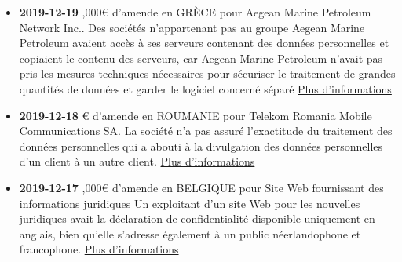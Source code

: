 \documentclass[french]{article}
\begin{document}
\newpage
\justify
	\begin{multicols}{2}
		\begin{itemize}
			\item \textbf{2019-12-19} ,000€ d'amende en GRÈCE pour Aegean Marine Petroleum Network Inc..
			\newline
			Des sociétés n'appartenant pas au groupe Aegean Marine Petroleum avaient accès à ses serveurs contenant des données personnelles et copiaient le contenu des serveurs, car Aegean Marine Petroleum n'avait pas pris les mesures techniques nécessaires pour sécuriser le traitement de grandes quantités de données et garder le logiciel concerné séparé
			\newline
			\href{http://www.dpa.gr/APDPXPortlets/htdocs/documentDisplay.jsp?docid=205,136,113,56,60,108,243,88}{Plus d'informations}
			\vspace{1cm}
	
			\item \textbf{2019-12-18} € d'amende en ROUMANIE pour Telekom Romania Mobile Communications SA.
			\newline
			La société n'a pas assuré l'exactitude du traitement des données personnelles qui a abouti à la divulgation des données personnelles d'un client à un autre client.
			\newline
			\href{https://www.dataprotection.ro/?page=O_noua_amenda_pentru_incalcarea_RGPD_comunicat_decembrie&lang=ro}{Plus d'informations}
			\vspace{1cm}
	
			\item \textbf{2019-12-17} ,000€ d'amende en BELGIQUE pour Site Web fournissant des informations juridiques
			\newline
			Un exploitant d'un site Web pour les nouvelles juridiques avait la déclaration de confidentialité disponible uniquement en anglais, bien qu'elle s'adresse également à un public néerlandophone et francophone.
			\newline
			\href{https://www.gegevensbeschermingsautoriteit.be/sites/privacycommission/files/documents/BETG_12-2019_NL.PDF}{Plus d'informations}
		\end{itemize}
	\end{multicols}
\end{document}
